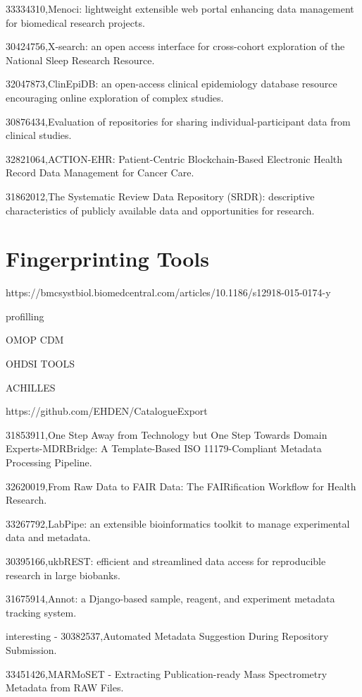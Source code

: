 33334310,Menoci: lightweight extensible web portal enhancing data management for biomedical research projects.

30424756,X-search: an open access interface for cross-cohort exploration of the National Sleep Research Resource.

32047873,ClinEpiDB: an open-access clinical epidemiology database resource encouraging online exploration of complex studies.

30876434,Evaluation of repositories for sharing individual-participant data from clinical studies.

32821064,ACTION-EHR: Patient-Centric Blockchain-Based Electronic Health Record Data Management for Cancer Care.

31862012,The Systematic Review Data Repository (SRDR): descriptive characteristics of publicly available data and opportunities for research.

\section{Fingerprinting Tools}

https://bmcsystbiol.biomedcentral.com/articles/10.1186/s12918-015-0174-y

\cite{maelstrom}

profilling

OMOP CDM

OHDSI TOOLS 

ACHILLES

https://github.com/EHDEN/CatalogueExport

31853911,One Step Away from Technology but One Step Towards Domain Experts-MDRBridge: A Template-Based ISO 11179-Compliant Metadata Processing Pipeline.

32620019,From Raw Data to FAIR Data: The FAIRification Workflow for Health Research.

33267792,LabPipe: an extensible bioinformatics toolkit to manage experimental data and metadata.

30395166,ukbREST: efficient and streamlined data access for reproducible research in large biobanks.

31675914,Annot: a Django-based sample, reagent, and experiment metadata tracking system.

interesting - 30382537,Automated Metadata Suggestion During Repository Submission.

33451426,MARMoSET - Extracting Publication-ready Mass Spectrometry Metadata from RAW Files.

